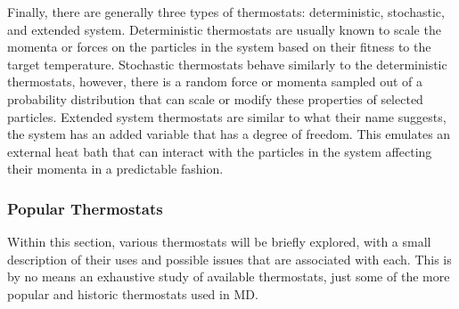 \documentclass[9pt,bestpractices]{livecoms}
\begin{document}
Finally, there are generally three types of thermostats: deterministic, stochastic, and extended system.
Deterministic thermostats are usually known to scale the momenta or forces on the particles in the system based on their fitness to the target temperature.
Stochastic thermostats behave similarly to the deterministic thermostats, however, there is a random force or momenta sampled out of a probability distribution that can scale or modify these properties of selected particles.
Extended system thermostats are similar to what their name suggests, the system has an added variable that has a degree of freedom.
This emulates an external heat bath that can interact with the particles in the system affecting their momenta in a predictable fashion.

\subsubsection{Popular Thermostats}
Within this section, various thermostats will be briefly explored, with a small description of their uses and possible issues that are associated with each.
This is by no means an exhaustive study of available thermostats, just some of the more popular and historic thermostats used in MD.
\end{document}
